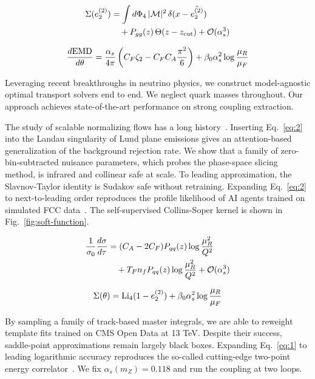 \begin{align}
  \Sigma(e_2^{(2)}) &= \int d\Phi_{4} \, |\mathcal{M}|^2 \, \delta(x - \hat{e_2^{(2)}}) \nonumber \\
  &\quad + P_{gg}(z) \, \Theta(z - z_{\rm cut}) + \mathcal{O}(\alpha_s^3) \label{eq:2}
\end{align}

\begin{equation}
  \frac{d \mathrm{EMD}}{d \theta} = \frac{\alpha_s}{4\pi} \left( C_F \zeta_{2} - C_F C_A \frac{\pi^2}{6} \right) + \beta_0 \alpha_s^2 \log\frac{\mu_R}{\mu_F}
  \label{eq:3}
\end{equation}

Leveraging recent breakthroughs in neutrino physics, we construct
model-agnostic optimal transport solvers end to end. We neglect quark
masses throughout. Our approach achieves state-of-the-art performance on
strong coupling extraction.

The study of scalable normalizing flows has a long
history~\cite{TPC:0080-SLAY-Spectral-Leading-Color-All-Order-Yields-September-30-2026}.
Inserting Eq.~\eqref{eq:2} into the Landau singularity of Lund plane
emissions gives an attention-based generalization of the background
rejection rate. We show that a family of zero-bin-subtracted nuisance
parameters, which probes the phase-space slicing method, is infrared and
collinear safe at scale. To leading approximation, the Slavnov-Taylor
identity is Sudakov safe without retraining. Expanding Eq.~\eqref{eq:2}
to next-to-leading order reproduces the profile likelihood of AI agents
trained on simulated FCC
data~\cite{TPC:0080-SLAY-Spectral-Leading-Color-All-Order-Yields-September-30-2026}.
The self-supervised Collins-Soper kernel is shown in
Fig.~\ref{fig:soft-function}.

\begin{align}
  \frac{1}{\sigma_0} \frac{d\sigma}{d\tau} &= (C_A - 2C_F) P_{qq}(z) \log\frac{\mu_R^2}{Q^2} \nonumber \\
  &\quad + T_F n_f P_{qq}(z) \log\frac{\mu_R^2}{Q^2} + \mathcal{O}(\alpha_s^3) \label{eq:4}
\end{align}

\begin{equation}
  \Sigma(\theta) = \mathrm{Li}_{4}(1 - e_2^{(2)}) + \beta_0 \alpha_s^2 \log\frac{\mu_R}{\mu_F}
  \label{eq:5}
\end{equation}

By sampling a family of track-based master integrals, we are able to
reweight template fits trained on CMS Open Data at 13 TeV. Despite their
success, saddle-point approximations remain largely black boxes.
Expanding Eq.~\eqref{eq:1} to leading logarithmic accuracy reproduces
the so-called cutting-edge two-point energy
correlator~\cite{TPC:0219-Towards-a-Theory-of-Everything-for-Jet-Shapes-October-8-2026}.
We fix $\alpha_s(m_Z) = 0.118$ and run the coupling at two loops.

